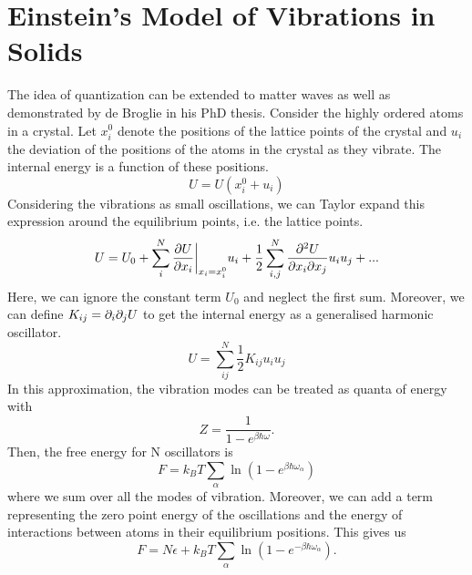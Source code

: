 \section{Einstein's Model of Vibrations in Solids}
    The idea of quantization can be extended to matter waves as well as demonstrated by de Broglie in his PhD thesis. Consider the highly ordered atoms in a crystal. Let $x_i^0$ denote the positions of the lattice points of the crystal and $u_i$ the deviation of the positions of the atoms in the crystal as they vibrate. The internal energy is a function of these positions.
    \begin{equation}
        U = U(x_i^0+u_i)
    \end{equation}
    Considering the vibrations as small oscillations, we can Taylor expand this expression around the equilibrium points, i.e. the lattice points. 
    \begin{equation}
        U = U_0 +\sum_i^N \frac{\partial U}{\partial x_i}\bigg\vert_{x_i=x_i^0}u_i + \frac{1}{2}\sum_{i,j}^N\frac{\partial ^2U}{\partial x_i\partial x_j}u_iu_j+...
    \end{equation}
    Here, we can ignore the constant term $U_0$ and neglect the first sum. Moreover, we can define $K_{ij}=\partial_i\partial_jU$ to get the internal energy as a generalised harmonic oscillator.
    \begin{equation}
        U = \sum_{ij}^N\frac{1}{2}K_{ij}u_iu_j
    \end{equation}
    In this approximation, the vibration modes can be treated as quanta of energy with
    \begin{equation}
        Z = \frac{1}{1-e^{\beta\hbar\omega}}.
    \end{equation}
    Then, the free energy for N oscillators is 
    \begin{equation}
        F = k_BT\sum_\alpha \ln(1-e^{\beta\hbar\omega_\alpha})
    \end{equation}
    where we sum over all the modes of vibration. Moreover, we can add a term representing the zero point energy of the oscillations and the energy of interactions between atoms in their equilibrium positions. This gives us 
    \begin{equation}
        F = N\epsilon + k_BT\sum_\alpha \ln(1-e^{-\beta\hbar\omega_\alpha}).
        \label{eq:einsteinfreeenergy}
    \end{equation}
